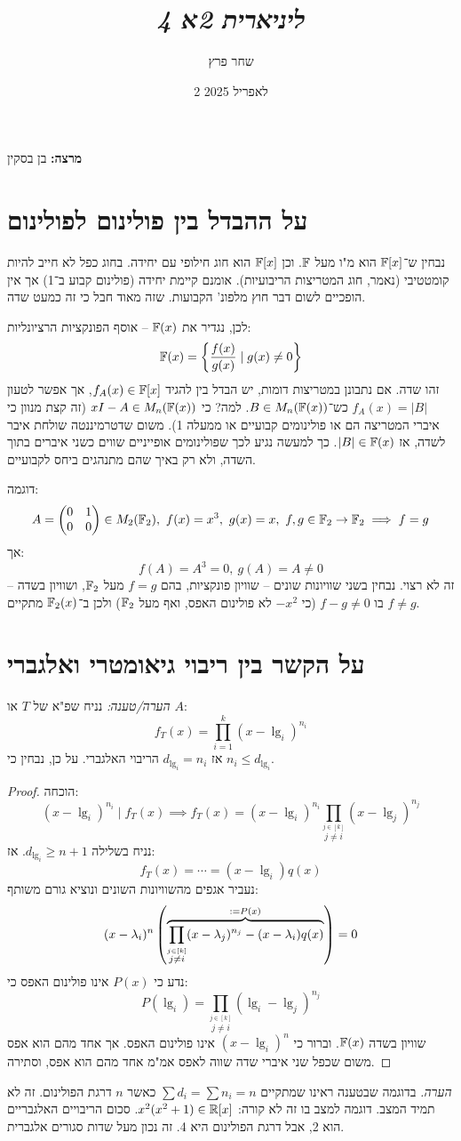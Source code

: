 \documentclass[]{../../../../tex/classes/styledArticle}
\author{שחר פרץ}
\title{\textit{ליניארית 2א 4}}
\date{2 לאפריל 2025}
\begin{document}
	\maketitle
	\textbf{מרצה: }בן בסקין
	\section{על ההבדל בין פולינום לפולינום}
	נבחין ש־$\mathbb{F}[x]$ הוא מ"ו מעל $\mathbb{F}$. וכן $\mathbb{F}[x]$ הוא חוג חילופי עם יחידה. בחוג כפל לא חייב להיות קומטטיבי (נאמר, חוג המטריצות הריבועיות). אומנם קיימת יחידה (פולינום קבוע ב־1) אך אין הופכיים לשום דבר חוץ מלפונ' הקבועות. שזה מאוד חבל כי זה כמעט שדה. 
	
	לכן, נגדיר את $\mathbb{F}(x)$ – אוסף הפונקציות הרציונליות: 
	\[ \mathbb{F}(x) = \left \{ \frac{f(x)}{g(x)} \mid g(x) \neq 0 \right \} \]
	זהו שדה. אם נתבונן במטריצות דומות, יש הבדל בין להגיד $f_A(x) \in \mathbb{F}[x]$, אך אפשר לטעון $f_A(x) = |B|$ כש־$B \in M_n(\mathbb{F}(x))$. למה? כי $xI - A \in M_n(\mathbb{F}(x))$ (זה קצת מנוון כי איברי המטריצה הם או פולינומים קבועיים או ממעלה 1). משום שדטרמיננטה שולחת איבר לשדה, אז $|B| \in \mathbb{F}(x)$. כך למעשה נגיע לכך שפולינומים אופייניים שווים כשני איברים בתוך השדה, ולא רק באיך שהם מתנהגים ביחס לקבועיים. 
	
	דוגמה: 
	\[ A = \begin{pmatrix} 0 & 1 \\ 0 & 0 \end{pmatrix} \in M_2(\mathbb{F}_2), \ f(x) = x^3, \ g(x) = x, \ f, g \in \mathbb{F}_2 \to \mathbb{F}_2 \implies f = g \]
	אך: 
	\[ f(A) = A^3 = 0, \ g(A) = A \neq 0 \]
	זה לא רצוי. נבחין בשני שוויונות שונים – שוויון פונקציות, בהם $f = g$ מעל $\mathbb{F}_2$, ושוויון בשדה – בו $f -g \neq 0$ (כי $-x^2$ לא פולינום האפס, ואף מעל $\mathbb{F}_2$) ולכן ב־$\mathbb{F}_2(x)$ מתקיים $f \neq g$. 
	
	\section{על הקשר בין ריבוי גיאומטרי ואלגברי}
	\textit{הערה/טענה: }נניח שפ"א של $T$ או $A$: 
	\[ f_T(x) = \prod_{i = 1}^{k}(x - \lg_i)^{n_i} \]
	אז $d_{\lg_i} = n_i$ הריבוי האלגברי. על כן, נבחין כי $n_i \le d_{\lg_i}$. \begin{proof}
		{הוכחה: }
		\[ (x - \lg_i)^{n_i} \mid f_T(x) \implies f_T(x) = (x - \lg_i)^{n_i} \prod_{\overset{j \in [k]}{j \neq i}}(x - \lg_j)^{n_j} \]
		נניח בשלילה $d_{\lg_i} \ge n + 1$. אז: 
		\[ f_T(x) = \cdots = (x - \lg_i)q(x) \]
		נעביר אגפים מהשוויונות השונים ונוציא גורם משותף: 
		\[ (x - \lambda_i)^{n}\left ( \overbrace{\prod_{\overset{j \in [k]}{j \neq i}}(x - \lambda_j)^{n_j} - (x - \lambda_i)q(x)}^{:=P(x)} \right ) = 0 \]
		נדע כי $P(x)$ אינו פולינום האפס כי: 
		\[ P(\lg_i) = \prod_{\overset{j \in [k]}{j \neq i}}(\lg_i - \lg_j)^{n_j} \]
		שוויון בשדה $\mathbb{F}(x)$. וברור כי $(x - \lg_i)^{n}$ אינו פולינום האפס. אך אחד מהם הוא אפס משום שכפל שני איברי שדה שווה לאפס אמ"מ אחד מהם הוא אפס, וסתירה. 
	\end{proof}
	\textit{הערה. }בדוגמה שבטענה ראינו שמתקיים $\sum d_i = \sum n_i = n$ כאשר $n$ דרגת הפולינום. זה לא תמיד המצב. 
	דוגמה למצב בו זה לא קורה: $x^2(x^2 + 1) \in \mathbb{R}[x]$. סכום הריבויים האלגבריים הוא 2, אבל דרגת הפולינום היא 4. זה נכון מעל שדות סגורים אלגברית. 
	
\end{document}
